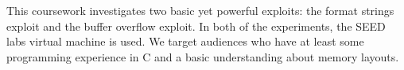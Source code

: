 This coursework investigates two basic yet powerful exploits: the format strings exploit and the buffer overflow exploit. In both of the experiments, the SEED labs virtual machine is used. We target audiences who have at least some programming experience in C and a basic understanding about memory layouts.